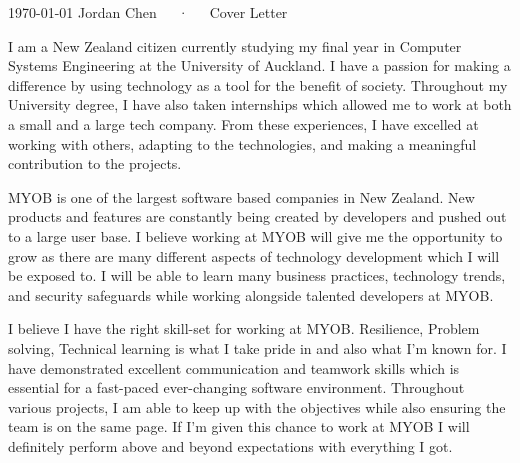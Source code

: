 \documentclass[11pt, a4paper]{awesome-cv}
\begin{document}
\makecvheader[L]

\makecvfooter
  {\today}
  {Jordan Chen~~~·~~~Cover Letter}
  {}

\makelettertitle

\begin{cvletter}

I am a New Zealand citizen currently studying my final year in Computer Systems Engineering at the University of Auckland. I have a passion for making a difference by using technology as a tool for the benefit of society. Throughout my University degree, I have also taken internships which allowed me to work at both a small and a large tech company. From these experiences, I have excelled at working with others, adapting to the technologies, and making a meaningful contribution to the projects.

MYOB is one of the largest software based companies in New Zealand. New products and features are constantly being created by developers and pushed out to a large user base. I believe working at MYOB will give me the opportunity to grow as there are many different aspects of technology development which I will be exposed to. I will be able to learn many business practices, technology trends, and security safeguards while working alongside talented developers at MYOB.

I believe I have the right skill-set for working at MYOB. Resilience, Problem solving, Technical learning is what I take pride in and also what I'm known for. I have demonstrated excellent communication and teamwork skills which is essential for a fast-paced ever-changing software environment. Throughout various projects, I am able to keep up with the objectives while also ensuring the team is on the same page. If I'm given this chance to work at MYOB I will definitely perform above and beyond expectations with everything I got.

\end{cvletter}


\makeletterclosing
\end{document}

